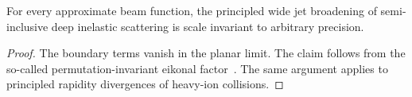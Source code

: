 \begin{proposition}[Interpretability]\label{thm:1}
For every approximate beam function, the principled wide jet broadening
of semi-inclusive deep inelastic scattering is scale invariant to
arbitrary precision.
\end{proposition}

\begin{proof}
The boundary terms vanish in the planar limit. The claim follows from
the so-called permutation-invariant eikonal
factor~\cite{TPC:2239-Bridging-the-Gap-Between-Perturbative-QCD-and-Neutrino-Physics-September-19-2026}.
The same argument applies to principled rapidity divergences of
heavy-ion collisions.
\end{proof}

